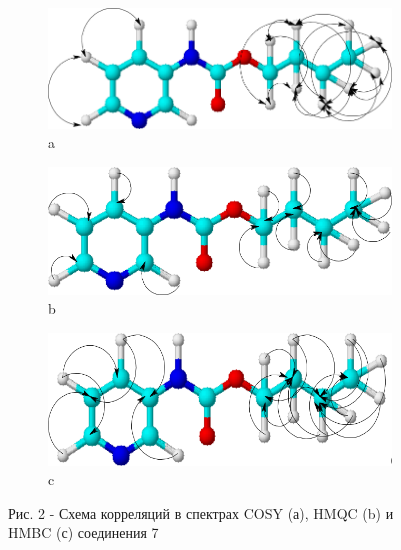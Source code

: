 \begin{figure}[H]
    \centering
    \begin{subfigure}[b]{0.32\textwidth}
        \centering
        \includegraphics[width=\textwidth]{assets/7}
        \caption*{a}
    \end{subfigure}
    \hfill
    \begin{subfigure}[b]{0.32\textwidth}
        \centering
        \includegraphics[width=\textwidth]{assets/8}
        \caption*{b}
    \end{subfigure}
    \hfill
    \begin{subfigure}[b]{0.32\textwidth}
        \centering
        \includegraphics[width=\textwidth]{assets/9}
        \caption*{c}
    \end{subfigure}
    \caption*{Рис. 2 - Схема корреляций в спектрах COSY (а), HMQC (b) и HMBC (с) соединения 7}
\end{figure}

